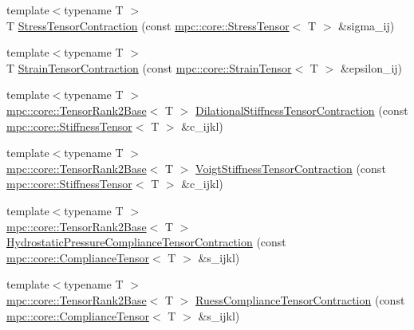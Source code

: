 \begin{DoxyCompactItemize}
\item 
{\footnotesize template$<$typename T $>$ }\\T \mbox{\hyperlink{namespacempc_1_1rockphysics_a8135f4b9ab5b9f0b03b8ce41688a8eda}{Stress\+Tensor\+Contraction}} (const \mbox{\hyperlink{structmpc_1_1core_1_1_stress_tensor}{mpc\+::core\+::\+Stress\+Tensor}}$<$ T $>$ \&sigma\+\_\+ij)
\item 
{\footnotesize template$<$typename T $>$ }\\T \mbox{\hyperlink{namespacempc_1_1rockphysics_a1fa58a28d857413244986ece16926de9}{Strain\+Tensor\+Contraction}} (const \mbox{\hyperlink{structmpc_1_1core_1_1_strain_tensor}{mpc\+::core\+::\+Strain\+Tensor}}$<$ T $>$ \&epsilon\+\_\+ij)
\item 
{\footnotesize template$<$typename T $>$ }\\\mbox{\hyperlink{structmpc_1_1core_1_1_tensor_rank2_base}{mpc\+::core\+::\+Tensor\+Rank2\+Base}}$<$ T $>$ \mbox{\hyperlink{namespacempc_1_1rockphysics_a30179402f47d7229ee4f2b92999e313b}{Dilational\+Stiffness\+Tensor\+Contraction}} (const \mbox{\hyperlink{structmpc_1_1core_1_1_stiffness_tensor}{mpc\+::core\+::\+Stiffness\+Tensor}}$<$ T $>$ \&c\+\_\+ijkl)
\item 
{\footnotesize template$<$typename T $>$ }\\\mbox{\hyperlink{structmpc_1_1core_1_1_tensor_rank2_base}{mpc\+::core\+::\+Tensor\+Rank2\+Base}}$<$ T $>$ \mbox{\hyperlink{namespacempc_1_1rockphysics_a0b82ccff88d9a955297715f83cf19a8b}{Voigt\+Stiffness\+Tensor\+Contraction}} (const \mbox{\hyperlink{structmpc_1_1core_1_1_stiffness_tensor}{mpc\+::core\+::\+Stiffness\+Tensor}}$<$ T $>$ \&c\+\_\+ijkl)
\item 
{\footnotesize template$<$typename T $>$ }\\\mbox{\hyperlink{structmpc_1_1core_1_1_tensor_rank2_base}{mpc\+::core\+::\+Tensor\+Rank2\+Base}}$<$ T $>$ \mbox{\hyperlink{namespacempc_1_1rockphysics_aff4d878ffd88b30e7145e7fe3cdf78e7}{Hydrostatic\+Pressure\+Compliance\+Tensor\+Contraction}} (const \mbox{\hyperlink{structmpc_1_1core_1_1_compliance_tensor}{mpc\+::core\+::\+Compliance\+Tensor}}$<$ T $>$ \&s\+\_\+ijkl)
\item 
{\footnotesize template$<$typename T $>$ }\\\mbox{\hyperlink{structmpc_1_1core_1_1_tensor_rank2_base}{mpc\+::core\+::\+Tensor\+Rank2\+Base}}$<$ T $>$ \mbox{\hyperlink{namespacempc_1_1rockphysics_af0944164902bfb3aee857caed6c2d07f}{Ruess\+Compliance\+Tensor\+Contraction}} (const \mbox{\hyperlink{structmpc_1_1core_1_1_compliance_tensor}{mpc\+::core\+::\+Compliance\+Tensor}}$<$ T $>$ \&s\+\_\+ijkl)
\end{DoxyCompactItemize}


